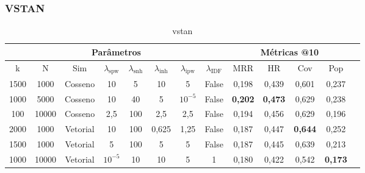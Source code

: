 \subsubsection{VSTAN}
\begin{table}[htbp]
    \centering
    \begin{tabular}{|c|c|c|c|c|c|c|c|c|c|c|c|c|}
      \hline
      \multicolumn{8}{|c|}{Parâmetros} & \multicolumn{4}{c|}{Métricas @10} \\
      \hline
      k & N & Sim & $\lambda_{\text{spw}}$ & $\lambda_{\text{snh}}$ & $\lambda_{\text{inh}}$ & $\lambda_{\text{ipw}}$ & $\lambda_{\text{IDF}}$ & MRR & HR & Cov & Pop \\
      \hline
      1500 & 1000 & Cosseno & 10 & 5 & 10 & 5 & False & 0,198 & 0,439 & 0,601 & 0,237 \\
      \hline
      1000 & 5000 & Cosseno & 10 & 40 & 5 & $10^{-5}$ & False & \textbf{0,202} & \textbf{0,473} & 0,629 & 0,238 \\
      \hline
      100 & 10000 & Cosseno & 2,5 & 100 & 2,5 & 2,5 & False & 0,194 & 0,456 & 0,629 & 0,196 \\
      \hline
      2000 & 1000 & Vetorial & 10 & 100 & 0,625 & 1,25 & False & 0,187 & 0,447 & \textbf{0,644} & 0,252 \\
      \hline
      1500 & 1000 & Vetorial & 5 & 100 & 5 & 5 & False & 0,187 & 0,445 & 0,639 & 0,213 \\
      \hline
      1000 & 10000 & Vetorial & $10^{-5}$ & 10 & 10 & 5 & 1 & 0,180 & 0,422 & 0,542 & \textbf{0,173} \\
      \hline
    \end{tabular}
    \caption{vstan}
  \end{table}

